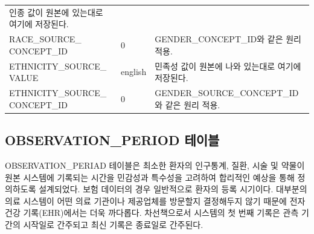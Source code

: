 \documentclass[11pt]{book}
\theoremstyle{definition}
\theoremstyle{definition}
\theoremstyle{definition}
\theoremstyle{remark}
\begin{document}
\begin{longtable}[]{@{}lll@{}}
\begin{minipage}[t]{0.48\columnwidth}
인종 값이 원본에 있는대로 여기에 저장된다.\strut
\end{minipage}\tabularnewline
\begin{minipage}[t]{0.28\columnwidth}\raggedright\strut
RACE\_SOURCE\_ CONCEPT\_ID\strut
\end{minipage} & \begin{minipage}[t]{0.16\columnwidth}\raggedright\strut
0\strut
\end{minipage} & \begin{minipage}[t]{0.48\columnwidth}\raggedright\strut
GENDER\_CONCEPT\_ID와 같은 원리 적용.\strut
\end{minipage}\tabularnewline
\begin{minipage}[t]{0.28\columnwidth}\raggedright\strut
ETHNICITY\_SOURCE\_ VALUE\strut
\end{minipage} & \begin{minipage}[t]{0.16\columnwidth}\raggedright\strut
english\strut
\end{minipage} & \begin{minipage}[t]{0.48\columnwidth}\raggedright\strut
민족성 값이 원본에 나와 있는대로 여기에 저장된다.\strut
\end{minipage}\tabularnewline
\begin{minipage}[t]{0.28\columnwidth}\raggedright\strut
ETHNICITY\_SOURCE\_ CONCEPT\_ID\strut
\end{minipage} & \begin{minipage}[t]{0.16\columnwidth}\raggedright\strut
0\strut
\end{minipage} & \begin{minipage}[t]{0.48\columnwidth}\raggedright\strut
GENDER\_SOURCE\_CONCEPT\_ID와 같은 원리 적용.\strut
\end{minipage}\tabularnewline
\bottomrule
\end{longtable}

\subsection{OBSERVATION\_PERIOD 테이블}\label{observationPeriod}

OBSERVATION\_PERIAD 테이블은 최소한 환자의 인구통계, 질환, 시술 및
약물이 원본 시스템에 기록되는 시간을 민감성과 특수성을 고려하여 합리적인
예상을 통해 정의하도록 설계되었다. 보험 데이터의 경우 일반적으로 환자의
등록 시기이다. 대부분의 의료 시스템이 어떤 의료 기관이나 제공업체를
방문할지 결정해두지 않기 때문에 전자 건강 기록(EHR)에서는 더욱 까다롭다.
차선책으로서 시스템의 첫 번째 기록은 관측 기간의 시작일로 간주되고 최신
기록은 종료일로 간주된다.
\end{document}
